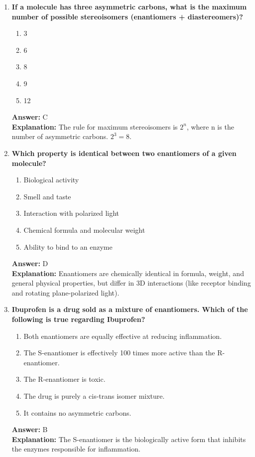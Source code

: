 \documentclass[11pt, a4paper]{article}
\begin{document}
\begin{enumerate}
\item \textbf{If a molecule has three asymmetric carbons, what is the maximum number of possible stereoisomers (enantiomers + diastereomers)?}
\begin{enumerate}[label=\Alph*.]
    \item 3
    \item 6
    \item 8
    \item 9
    \item 12
\end{enumerate}
\textbf{Answer:} C \\
\textbf{Explanation:} The rule for maximum stereoisomers is $2^n$, where n is the number of asymmetric carbons. $2^3 = 8$.

\item \textbf{Which property is identical between two enantiomers of a given molecule?}
\begin{enumerate}[label=\Alph*.]
    \item Biological activity
    \item Smell and taste
    \item Interaction with polarized light
    \item Chemical formula and molecular weight
    \item Ability to bind to an enzyme
\end{enumerate}
\textbf{Answer:} D \\
\textbf{Explanation:} Enantiomers are chemically identical in formula, weight, and general physical properties, but differ in 3D interactions (like receptor binding and rotating plane-polarized light).

\item \textbf{Ibuprofen is a drug sold as a mixture of enantiomers. Which of the following is true regarding Ibuprofen?}
\begin{enumerate}[label=\Alph*.]
    \item Both enantiomers are equally effective at reducing inflammation.
    \item The S-enantiomer is effectively 100 times more active than the R-enantiomer.
    \item The R-enantiomer is toxic.
    \item The drug is purely a cis-trans isomer mixture.
    \item It contains no asymmetric carbons.
\end{enumerate}
\textbf{Answer:} B \\
\textbf{Explanation:} The S-enantiomer is the biologically active form that inhibits the enzymes responsible for inflammation.


\end{enumerate}
\end{document}
